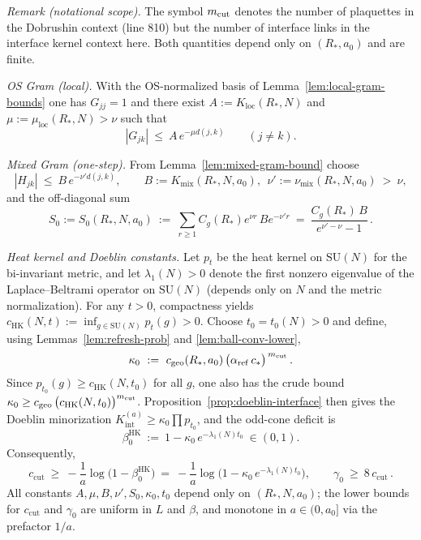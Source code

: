 \documentclass[11pt]{amsart}
\begin{document}
\emph{Remark (notational scope).} The symbol $m_{\rm cut}$ denotes the number of plaquettes in the Dobrushin context (line 810) but the number of interface links in the interface kernel context here. Both quantities depend only on $(R_*,a_0)$ and are finite.

\emph{OS Gram (local).} With the OS-normalized basis of Lemma~\ref{lem:local-gram-bounds} one has $G_{jj}=1$ and there exist $A:=K_{\mathrm{loc}}(R_*,N)$ and $\mu:=\mu_{\mathrm{loc}}(R_*,N)>\nu$ such that
\[
  |G_{jk}|\ \le\ A\,e^{-\mu d(j,k)}\qquad (j\ne k).
\]

\emph{Mixed Gram (one-step).} From Lemma~\ref{lem:mixed-gram-bound} choose
\[
  |H_{jk}|\ \le\ B\,e^{-\nu' d(j,k)},\qquad B:=K_{\mathrm{mix}}(R_*,N,a_0),\ \ \nu':=\nu_{\mathrm{mix}}(R_*,N,a_0)\ >\ \nu,
\]
and the off-diagonal sum
\[
  S_0:=S_0(R_*,N,a_0)\ :=\ \sum_{r\ge 1} C_g(R_*) e^{\nu r}\, B e^{-\nu' r}
   \ =\ \frac{C_g(R_*)\,B}{e^{\nu'-\nu}-1}\,.
\]

\emph{Heat kernel and Doeblin constants.} Let $p_t$ be the heat kernel on $\mathrm{SU}(N)$ for the bi-invariant metric, and let $\lambda_1(N)>0$ denote the first nonzero eigenvalue of the Laplace--Beltrami operator on $\mathrm{SU}(N)$ (depends only on $N$ and the metric normalization). For any $t>0$, compactness yields $c_{\mathrm{HK}}(N,t):=\inf_{g\in \mathrm{SU}(N)} p_t(g)>0$. Choose $t_0=t_0(N)>0$ and define, using Lemmas~\ref{lem:refresh-prob} and \ref{lem:ball-conv-lower},
\[
  \kappa_0\ :=\ c_{\mathrm{geo}}(R_*,a_0)\,\bigl(\alpha_{\mathrm{ref}}\,c_*\bigr)^{\,m_{\rm cut}}\,.
\]
Since $p_{t_0}(g)\ge c_{\mathrm{HK}}(N,t_0)$ for all $g$, one also has the crude bound $\kappa_0\ge c_{\mathrm{geo}}\,\bigl(c_{\mathrm{HK}}(N,t_0)\bigr)^{m_{\rm cut}}$. Proposition~\ref{prop:doeblin-interface} then gives the Doeblin minorization $K_{\mathrm{int}}^{(a)}\ge \kappa_0 \prod p_{t_0}$, and the odd-cone deficit is
\[
  \beta_0^{\mathrm{HK}}\ :=\ 1-\kappa_0\,e^{-\lambda_1(N) t_0}\ \in (0,1).
\]
Consequently,
\[
  c_{\mathrm{cut}}\ \ge\ -\frac{1}{a}\log\bigl(1-\beta_0^{\mathrm{HK}}\bigr)
   \ =\ -\frac{1}{a}\log\bigl(1-\kappa_0\,e^{-\lambda_1(N) t_0}\bigr),
  \qquad \gamma_0\ \ge\ 8\,c_{\mathrm{cut}}\,.
\]
All constants $A,\mu,B,\nu',S_0,\kappa_0,t_0$ depend only on $(R_*,N,a_0)$; the lower bounds for $c_{\mathrm{cut}}$ and $\gamma_0$ are uniform in $L$ and $\beta$, and monotone in $a\in(0,a_0]$ via the prefactor $1/a$.
\end{document}
